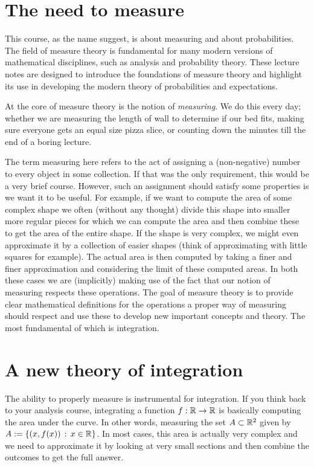 


\section{The need to measure}
This course, as the name suggest, is about measuring and about probabilities. The field of measure theory is fundamental for many modern versions of mathematical disciplines, such as analysis and probability theory. These lecture notes are designed to introduce the foundations of measure theory and highlight its use in developing the modern theory of probabilities and expectations.  

At the core of measure theory is the notion of \emph{measuring}. We do this every day; whether we are measuring the length of wall to determine if our bed fits, making sure everyone gets an equal size pizza slice, or counting down the minutes till the end of a boring lecture. 

The term measuring here refers to the act of assigning a (non-negative) number to every object in some collection. If that was the only requirement, this would be a very brief course. However, such an assignment should satisfy some properties is we want it to be useful. For example, if we want to compute the area of some complex shape we often (without any thought) divide this shape into smaller more regular pieces for which we can compute the area and then combine these to get the area of the entire shape. If the shape is very complex, we might even approximate it by a collection of easier shapes (think of approximating with little squares for example). The actual area is then computed by taking a finer and finer approximation and considering the limit of these computed areas. In both these cases we are (implicitly) making use of the fact that our notion of measuring respects these operations. The goal of measure theory is to provide clear mathematical definitions for the operations a proper way of measuring should respect and use these to develop new important concepts and theory. The most fundamental of which is integration. 

\section{A new theory of integration}

The ability to properly measure is instrumental for integration. If you think back to your analysis course, integrating a function $f : \mathbb R \to \mathbb R$ is basically computing the area under the curve. In other words, measuring the set $A \subset \mathbb R^2$ given by $A := \{(x,f(x)) \, :\, x \in \mathbb R\}$. In most cases, this area is actually very complex and we need to approximate it by looking at very small sections and then combine the outcomes to get the full answer.

